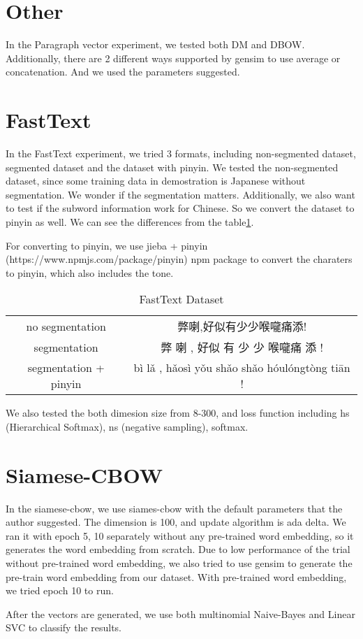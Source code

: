 \section{Other}

In the Paragraph vector experiment, we tested both DM and DBOW. Additionally, there are 2 different ways supported by gensim to use average or concatenation.
And we used the parameters suggested. 

\section{FastText}

In the FastText experiment, we tried 3 formats, including non-segmented dataset, segmented dataset and the dataset with pinyin.
We tested the non-segmented dataset, since some training data in demostration is Japanese without segmentation. We wonder if the segmentation matters.
Additionally, we also want to test if the subword information work for Chinese. So we convert the dataset to pinyin as well. We can see the differences from the table\ref{ftdataset}.

For converting to pinyin, we use jieba + pinyin (https://www.npmjs.com/package/pinyin) npm package to convert the  charaters to pinyin, which also includes the tone.

\begin{table}[]
\centering
\caption{FastText Dataset}
\label{ftdataset}
\begin{tabular}{|c|c|}
\hline
   & \\
\hline
no segmentation  & 弊喇,好似有少少喉嚨痛添! \\
segmentation  & 弊 喇 , 好似 有 少 少 喉嚨痛 添 ! \\
segmentation + pinyin  & bì lǎ , hǎosì yǒu shǎo shǎo hóulóngtòng tiān ! \\
\hline
\end{tabular}
\end{table}

We also tested the both dimesion size from 8-300, and loss function including hs (Hierarchical Softmax), ns (negative sampling), softmax.


\section{Siamese-CBOW}

In the siamese-cbow, we use siames-cbow with the default parameters that the author suggested. 
The dimension is 100, and update algorithm is ada delta. 
We ran it with epoch 5, 10 separately without any pre-trained word embedding, so it generates the word embedding from scratch.
Due to low performance of the trial without pre-trained word embedding, we also tried to use gensim to generate the pre-train word embedding from our dataset.
With pre-trained word embedding, we tried epoch 10 to run.

After the vectors are generated, we use both multinomial Naive-Bayes and Linear SVC to classify the results.